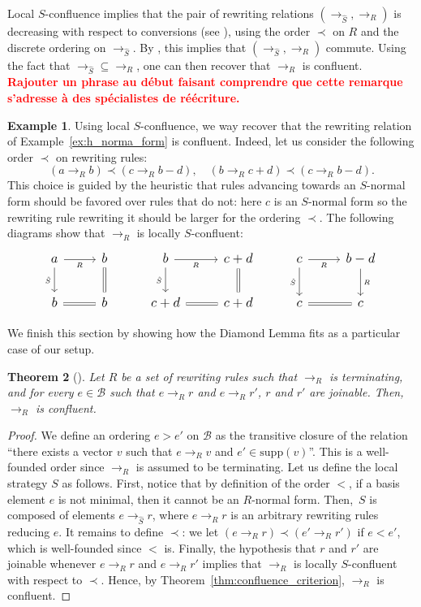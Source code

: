 \documentclass[10pt]{easychair}
\newtheorem{theorem}{Theorem}[section]
\theoremstyle{definition}
\newtheorem{example}[theorem]{Example}
\newcommand\todo[1]{{\bf\textcolor{red}{#1.}}}
\newcommand\supp{\text{supp}}
\newcommand\basis{\mathscr{B}}
\newcommand\rewR{\to_R}
\newcommand\rewS{\to_{\hat{S}}}
\begin{document}
Local $S$-confluence implies that the pair of rewriting relations
$(\rewS,\rewR)$ is decreasing with respect to conversions (see
\cite[Definition 3]{van2008confluence}), using the order $\prec$ on $R$
and the discrete ordering on $\rewS$. By
\cite[Theorem 3]{van2008confluence}, this implies that $(\rewS,\rewR)$
commute. Using the fact that $\rewS \subseteq \rewR$, one can then
recover that $\rewR$ is confluent.
\todo{Rajouter un phrase au début faisant comprendre que cette remarque
  s'adresse à des spécialistes de réécriture}
\smallskip

\begin{example}\label{ex:end_to_example}
  Using local $S$-confluence, we way recover that the rewriting relation
  of Example~\ref{ex:h_norma_form} is confluent. Indeed, let us consider
  the following order $\prec$ on rewriting rules:
  \[(a\rewR b)\prec(c\rewR b-d),\quad(b\rewR c+d)\prec(c\rewR b-d).\]
  This choice is guided by the heuristic that rules advancing towards an
  $S$-normal form should be favored over rules that do not: here $c$ is
  an $S$-normal form so the rewriting rule rewriting it should be larger for the ordering $\prec$.
  The following diagrams show that $\rewR$ is locally $S$-confluent:
  \[\large\begin{tikzcd}
  a\ar[r, "_R"']\ar[d, "_{\hat{S}}"'] & b\ar[d, equal] & b\ar[r, "_R"']
  \ar[d, "_{\hat{S}}"'] & c+d\ar[d, equal] & c\ar[r, "_R"']\ar[d,
    "_{\hat{S}}"'] & b-d\ar[d, "_R"]\\
  b\ar[r, equal] & b & c+d\ar[r, equal] & c+d & c\ar[r, equal] & c
  \end{tikzcd}\]
\end{example}
\smallskip

We finish this section by showing how the Diamond Lemma fits as a
particular case of our setup.
\medskip

\begin{theorem}[\cite{MR506890}]\label{thm:diamond_lemma}
  Let $R$ be a set of rewriting rules such that $\rewR$ is terminating,
  and for every $e\in\basis$ such that $e\rewR r$ and $e\rewR r'$, $r$
  and $r'$ are joinable. Then,~$\rewR$ is confluent.
\end{theorem}

\begin{proof}
  We define an ordering $e>e'$ on $\basis$ as the transitive closure of
  the relation ``there exists a vector $v$ such that $e\rewR v$ and
  $e'\in\supp(v)$''. This is a well-founded order since $\rewR$ is
  assumed to be terminating. Let us define the local strategy $S$ as
  follows. First, notice that by definition of the order $<$, if a
  basis element $e$ is not minimal, then it cannot be an $R$-normal form.
  Then,~$S$ is composed of elements $e\rewS r$, where $e\rewR r$ is an
  arbitrary rewriting rules reducing $e$. It remains to define $\prec$:
  we let $(e\rewR r)\prec(e'\rewR r')$ if $e<e'$, which is well-founded
  since $<$ is. Finally, the hypothesis that $r$ and $r'$ are joinable whenever
  $e\rewR r$ and $e\rewR r'$ implies that $\rewR$ is locally
  $S$-confluent with respect to $\prec$. Hence, by
  Theorem~\ref{thm:confluence_criterion}, $\rewR$ is confluent.   
\end{proof}
\end{document}

